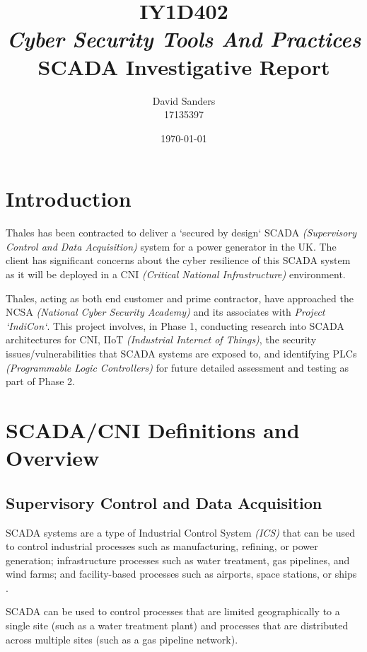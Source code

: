 \documentclass[12pt]{article}
\title{IY1D402{\textit{\small \\Cyber Security Tools And Practices}}\\SCADA Investigative Report}
\author{David Sanders\\{\LARGE 17135397}}
\date{\today}
\newcommand{\todo}[1]{\textcolor{red}{todo: #1}}
\begin{document}
\maketitle
\pagebreak
\tableofcontents

\pagebreak
\section{Introduction}
Thales has been contracted to deliver a `secured by design` SCADA \textit{(Supervisory Control and Data Acquisition)} system for a power generator in the UK. The client has significant concerns about the cyber resilience of this SCADA system as it will be deployed in a CNI \textit{(Critical National Infrastructure)} environment.

Thales, acting as both end customer and prime contractor, have approached the NCSA \textit{(National Cyber Security Academy)} and its associates with \textit{Project `IndiCon`}. This project involves, in Phase 1, conducting research into SCADA architectures for CNI, IIoT \textit{(Industrial Internet of Things)}, the security issues/vulnerabilities that SCADA systems are exposed to, and identifying PLCs \textit{(Programmable Logic Controllers)} for future detailed assessment and testing as part of Phase 2.


\section{SCADA/CNI Definitions and Overview}
\subsection{Supervisory Control and Data Acquisition}
SCADA systems are a type of Industrial Control System \textit{(ICS)} that can be used to control industrial processes such as manufacturing, refining, or power generation; infrastructure processes such as water treatment, gas pipelines, and wind farms; and facility-based processes such as airports, space stations, or ships \citep{site:scadasystems}.

SCADA can be used to control processes that are limited geographically to a single site (such as a water treatment plant) and processes that are distributed across multiple sites (such as a gas pipeline network).
\end{document}
